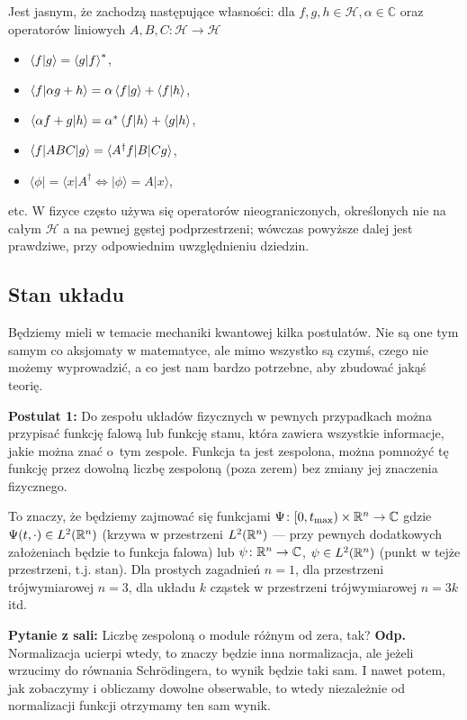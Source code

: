 Jest jasnym, że zachodzą następujące własności: dla
$f, g, h \in \mathcal H, \alpha \in \mathbb C$ oraz operatorów
liniowych $A, B, C\colon \mathcal H \to \mathcal H$
\begin{itemize}
    \item $\braket{f|g} = \braket{g|f}^*$,
    \item $\braket{f|\alpha g + h} = \alpha \braket{f|g} + \braket{f|h}$,
    \item $\braket{\alpha f + g|h} = \alpha^* \braket{f|h} + \braket{g|h}$,
    \item $\braket{f|ABC|g} = \braket{A^\dagger f| B | C g}$,
    \item $\langle \phi |  = \langle x | A^{\dagger} \iff | \phi \rangle = A | x \rangle$,
\end{itemize}
etc.
W fizyce często używa się operatorów nieograniczonych, określonych nie na
całym $\mathcal H$ a na pewnej gęstej podprzestrzeni; wówczas powyższe
dalej jest prawdziwe, przy odpowiednim uwzględnieniu dziedzin.




\subsection{Stan układu}
Będziemy mieli w temacie mechaniki kwantowej kilka postulatów. Nie są one tym samym co aksjomaty w matematyce, ale mimo wszystko są czymś, czego nie możemy wyprowadzić, a co jest nam bardzo potrzebne, aby zbudować jakąś teorię.

\textbf{Postulat 1:} Do zespołu układów fizycznych w pewnych przypadkach można przypisać funkcję falową lub funkcję stanu, która zawiera wszystkie informacje, jakie można znać o~tym zespole. Funkcja ta jest zespolona, można pomnożyć tę funkcję przez dowolną liczbę zespoloną (poza zerem) bez zmiany jej znaczenia fizycznego.

To znaczy, że będziemy zajmować się funkcjami
$\Psi \colon [0, t_{\text{max}}) \times \mathbb R^n \to \mathbb C$ gdzie $\Psi(t, \cdot ) \in L^2(\mathbb R^n)$
(krzywa w przestrzeni $L^2(\mathbb R^n)$ --- przy pewnych dodatkowych założeniach będzie
to funkcja falowa)
lub $\psi \colon \mathbb R^n \to \mathbb C$, $\psi \in L^2(\mathbb R^n)$ (punkt w tejże przestrzeni, t.j. stan).
Dla prostych zagadnień $n=1$, dla przestrzeni trójwymiarowej $n=3$, dla
układu $k$ cząstek w przestrzeni trójwymiarowej $n=3k$ itd.

\textbf{Pytanie z sali:} Liczbę zespoloną o module różnym od zera, tak? \textbf{Odp.} Normalizacja ucierpi wtedy, to znaczy będzie inna normalizacja, ale jeżeli wrzucimy do równania Schrödingera, to wynik będzie taki sam. I nawet potem, jak zobaczymy i obliczamy dowolne obserwable, to wtedy niezależnie od normalizacji funkcji otrzymamy ten sam wynik.

